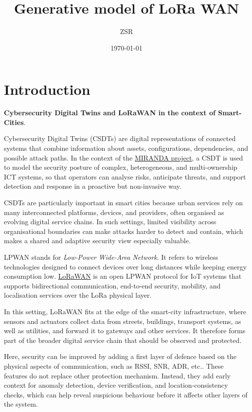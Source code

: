 \documentclass[11pt]{article}
\author{ZSR}
\date{\today}
\title{Generative model of LoRa WAN}
\begin{document}
\maketitle
\section{Introduction}
\label{sec:org5425f7e}

\textbf{Cybersecurity Digital Twins and LoRaWAN in the context of Smart-Cities}.

Cybersecurity Digital Twins (CSDTs) are digital representations of connected systems that combine information about assets, configurations, dependencies, and possible attack paths. In the context of the \href{https://www.mirandaproject.eu/}{MIRANDA project}, a CSDT is used to model the security posture of complex, heterogeneous, and multi-ownership ICT systems, so that operators can analyse risks, anticipate threats, and support detection and response in a proactive but non-invasive way.

CSDTs are particularly important in smart cities because urban services rely on many interconnected platforms, devices, and providers, often organised as evolving digital service chains. In such settings, limited visibility across organisational boundaries can make attacks harder to detect and contain, which makes a shared and adaptive security view especially valuable.

LPWAN stands for \emph{Low-Power Wide-Area Network}. It refers to wireless technologies designed to connect devices over long distances while keeping energy consumption low. \href{https://lora-alliance.org/about-lorawan/}{LoRaWAN} is an open LPWAN protocol for IoT systems that supports bidirectional communication, end-to-end security, mobility, and localisation services over the LoRa physical layer.

In this setting, LoRaWAN fits at the edge of the smart-city infrastructure, where sensors and actuators collect data from streets, buildings, transport systems, as well as utilities, and forward it to gateways and other services. It therefore forms part of the broader digital service chain that should be observed and protected.

Here, security can be improved by adding a first layer of defence based on the physical aspects of communication, such as RSSI, SNR, ADR, etc.. These features do not replace other protection mechanism. Instead, they add early context for anomaly detection, device verification, and location-consistency checks, which can help reveal suspicious behaviour before it affects other layers of the system.
\end{document}
